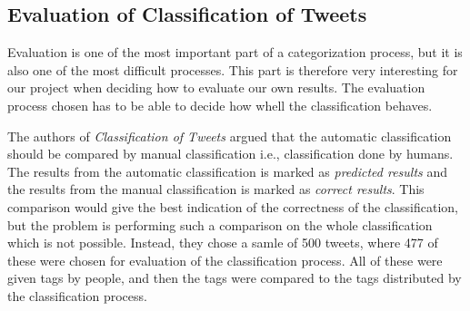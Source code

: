 \subsection{Evaluation of Classification of Tweets}
Evaluation is one of the most important part of a categorization process, but it is also one of the most difficult processes. This part is therefore very interesting for our project when deciding how to evaluate our own results. The evaluation process chosen has to be able to decide how whell the classification behaves.





The authors of \emph{Classification of Tweets} argued that the automatic classification should be compared by manual classification i.e., classification done by humans. The results from the automatic classification is marked as \emph{predicted results} and the results from the manual classification is marked as \emph{correct results}. This comparison would give the best indication of the correctness of the classification, but the problem is performing such a comparison on the whole classification which is not possible. Instead, they chose a samle of 500 tweets, where 477 of these were chosen for evaluation of the classification process. All of these were given tags by people, and then the tags were compared to the tags distributed by the classification process. 


